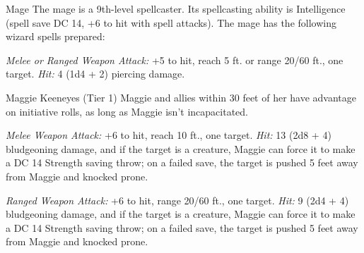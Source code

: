 \documentclass[10pt,a4paper,twoside,twocolumn,openany,nodeprecatedcode]{dndbook}
\begin{document}
\begin{DndMonster}[float=ht]{Mage}
\DndMonsterBasics[
armor-class = {12 (15 with mage armor)},
hit-points = {\DndDice{9d8}},
speed = {30 ft.}
]
\DndMonsterAbilityScores[
 str = 9,
 dex = 14,
 con = 11,
 int = 17,
 wis = 12,
 cha = 11
]
\DndMonsterDetails[
saving-throws = {Int +6, Wis +4},
skills = {Arcana +6, History +6},
languages = {any four languages},
challenge = 6,
]
The mage is a 9th-level spellcaster. Its spellcasting ability is Intelligence (spell save DC 14, +6 to hit with spell attacks). The mage has the following wizard spells prepared:
\begin{DndMonsterSpells}
\end{DndMonsterSpells}
\par
{}
\textsl{Melee or Ranged Weapon Attack:} +5 to hit, reach 5 ft. or range 20/60 ft., one target. \textsl{Hit:} 4 (1d4 + 2) piercing damage.

\end{DndMonster}


\clearpage
{}

\begin{DndMonster}[float=ht]{Maggie Keeneyes (Tier 1)}
\DndMonsterBasics[
armor-class = {13 (leather armor)},
hit-points = {\DndDice{10d10 + 30}},
speed = {30 ft.}
]
\DndMonsterAbilityScores[
 str = 18,
 dex = 14,
 con = 16,
 int = 14,
 wis = 14,
 cha = 8
]
\DndMonsterDetails[
saving-throws = {Str +6, Con +5},
skills = {Athletics +6, Insight +4, Perception +4, Persuasion +3},
senses = {darkvision 60 ft., passive perception 14},
languages = {Common, Giant},
challenge = 3,
]
Maggie and allies within 30 feet of her have advantage on initiative rolls, as long as Maggie isn't incapacitated.

\par
{}
\textsl{Melee Weapon Attack:} +6 to hit, reach 10 ft., one target. \textsl{Hit:} 13 (2d8 + 4) bludgeoning damage, and if the target is a creature, Maggie can force it to make a DC 14 Strength saving throw; on a failed save, the target is pushed 5 feet away from Maggie and knocked prone.

\textsl{Ranged Weapon Attack:} +6 to hit, range 20/60 ft., one target. \textsl{Hit:} 9 (2d4 + 4) bludgeoning damage, and if the target is a creature, Maggie can force it to make a DC 14 Strength saving throw; on a failed save, the target is pushed 5 feet away from Maggie and knocked prone.

\end{DndMonster}
\end{document}
